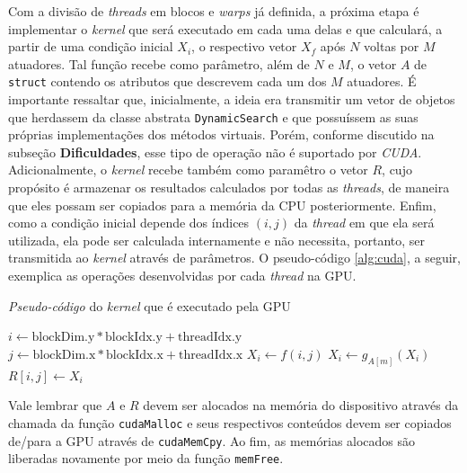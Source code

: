 \documentclass[12pt]{article}
\begin{document}
Com a divisão de \textit{threads} em blocos e \textit{warps} já definida, a
próxima etapa é implementar o \textit{kernel} que será executado em cada uma
delas e que calculará, a partir de uma condição inicial \(X_i\), o respectivo
vetor \(X_f\) após \(N\) voltas por \(M\)
atuadores. Tal função recebe como parâmetro, além de \(N\) e \(M\), o vetor
\(A\) de \texttt{struct} contendo os atributos que descrevem cada um dos \(M\)
atuadores. É importante ressaltar que, inicialmente, a ideia era transmitir um
vetor de objetos que herdassem da classe abstrata \texttt{DynamicSearch} e que
possuíssem as suas próprias implementações dos métodos virtuais. Porém, conforme
discutido na subseção \textbf{Dificuldades}, esse tipo de operação não é
suportado por \textit{CUDA}. Adicionalmente, o \textit{kernel} recebe também
como paramêtro o vetor $R$, cujo propósito é armazenar os resultados calculados
por todas as \textit{threads}, de maneira que eles possam ser copiados para a
memória da CPU posteriormente. Enfim, como a condição inicial depende dos
índices \((i,j)\) da \textit{thread} em que ela será utilizada, ela pode ser
calculada internamente e não necessita, portanto, ser transmitida ao
\textit{kernel} através de parâmetros. O pseudo-código \ref{alg:cuda}, a seguir,
exemplica as operações desenvolvidas por cada \textit{thread} na GPU.


\begin{algorithm}
\caption{\label{alg:cuda} \textit{Pseudo-código} do \textit{kernel} que é
executado pela GPU} \begin{algorithmic}[1]
  	\State ${i} \gets \text{blockDim.y} * \text{blockIdx.y} + \text{threadIdx.y} $  
  	\State ${j} \gets \text{blockDim.x} * \text{blockIdx.x} + \text{threadIdx.x} $   
    \State ${X_i} \gets f(i,j) $ 
     
         
        	\State $X_i \gets g_{A[m]} (X_i)$ 
    	\EndFor
    \EndFor
    \State ${R[i,j]} \gets X_i $ 
   \EndFunction

\end{algorithmic}
\end{algorithm}

Vale lembrar que \(A\) e \(R\) devem ser alocados na memória do dispositivo
através da chamada da função \texttt{cudaMalloc} e seus respectivos conteúdos
devem ser copiados de/para a GPU através de \texttt{cudaMemCpy}. Ao fim, as
memórias alocados são liberadas novamente por meio da função \texttt{memFree}.
\end{document}
